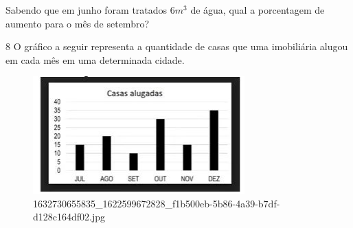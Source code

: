 \begin{escolha}
\begin{boxmedio}
\begin{boxmedio}
{\begin{boxpeq}
\begin{boxpeq}
{\begin{boxpeq}
\begin{boxmedio}
\begin{boxmedio}
\begin{boxpeq}
\begin{boxmedio}
\begin{boxpeq}
\begin{boxpeq}
\begin{boxpeq}
\begin{boxpeq}
\begin{boxmedio}
{\begin{boxmedio}
\begin{boxmedio}
\begin{boxpeq}
\begin{boxmedio}
\begin{boxpeq}
\begin{boxpeq}
\begin{boxpeq}
\begin{escolha}
{\begin{boxmedio}
\begin{boxpeq}
\begin{boxpeq}
\begin{boxpeq}
\begin{boxpeq}
\begin{boxpeq}
\begin{boxmedio}
\begin{boxpeq}
\begin{boxpeq}
\begin{boxpeq}
{\begin{boxpeq}
\begin{boxmedio}
\begin{boxpeq}
\begin{boxpeq}
\begin{boxpeq}
{\begin{boxpeq}
\begin{boxmedio}
{\begin{boxpeq}
\begin{boxpeq}
\begin{boxmedio}
\begin{boxmedio}
\begin{boxpeq}
\begin{boxpeq}
{\begin{boxpeq}
\begin{boxpeq}
\begin{boxpeq}
\begin{boxpeq}
\begin{boxpeq}
\begin{escolha}
\begin{escolha}
{\begin{boxmedio}
\begin{boxpeq}
\begin{q°}
\begin{boxmedio}
\begin{boxpeq}
\begin{boxpeq}
\begin{boxmedio}
\begin{boxmedio}
\begin{boxmedio}
\begin{boxmedio}
\begin{escolha}
  \item Sabendo que em junho foram tratados $6m^3$ de água, qual a porcentagem
  de aumento para o mês de setembro?



\end{escolha}

\num{8} O gráfico a seguir representa a quantidade de casas que uma
imobiliária alugou em cada mês em uma determinada cidade.

\begin{figure}
\centering
\includegraphics[width=3.21165in,height=1.77953in]{./_SAEB_9_MAT/media/image217.jpg}
\caption{1632730655835\_1622599672828\_f1b500eb-5b86-4a39-b7df-d128c164df02.jpg}
\end{figure}


\end{boxmedio}
\end{boxmedio}
\end{boxmedio}
\end{boxmedio}
\end{boxpeq}
\end{boxpeq}
\end{boxmedio}
\end{q°}
\end{boxpeq}
\end{boxmedio}}
\end{escolha}
\end{escolha}
\end{boxpeq}
\end{boxpeq}
\end{boxpeq}
\end{boxpeq}
\end{boxpeq}}
\end{boxpeq}
\end{boxpeq}
\end{boxmedio}
\end{boxmedio}
\end{boxpeq}
\end{boxpeq}}
\end{boxmedio}
\end{boxpeq}}
\end{boxpeq}
\end{boxpeq}
\end{boxpeq}
\end{boxmedio}
\end{boxpeq}}
\end{boxpeq}
\end{boxpeq}
\end{boxpeq}
\end{boxmedio}
\end{boxpeq}
\end{boxpeq}
\end{boxpeq}
\end{boxpeq}
\end{boxpeq}
\end{boxmedio}}
\end{escolha}
\end{boxpeq}
\end{boxpeq}
\end{boxpeq}
\end{boxmedio}
\end{boxpeq}
\end{boxmedio}
\end{boxmedio}}
\end{boxmedio}
\end{boxpeq}
\end{boxpeq}
\end{boxpeq}
\end{boxpeq}
\end{boxmedio}
\end{boxpeq}
\end{boxmedio}
\end{boxmedio}
\end{boxpeq}}
\end{boxpeq}
\end{boxpeq}}
\end{boxmedio}
\end{boxmedio}
\end{escolha}
